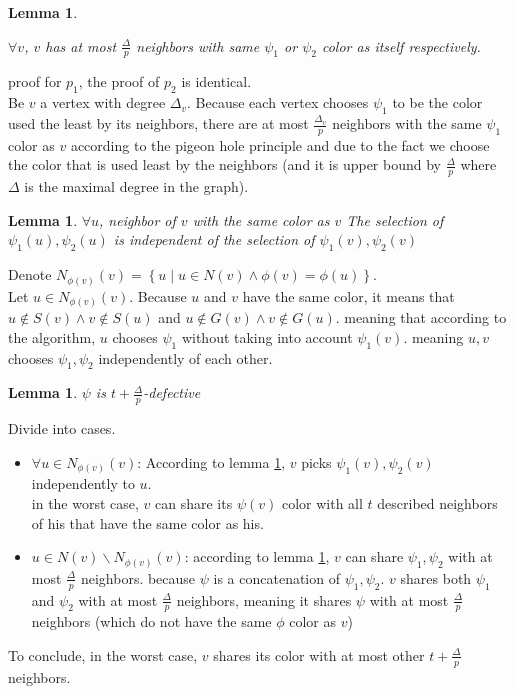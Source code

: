 \documentclass[11pt]{article}
\newtheorem{lemma}[theorem]{Lemma}
\begin{document}
\begin{lemma}
\label{psi_1_2_delta_defective}


$\forall v$, $v$ has at most $\frac{\Delta}{p}$ neighbors with same $\psi_1$ or $\psi_2$ color as itself respectively. 
\end{lemma}
proof for $p_1$, the proof of $p_2$ is identical. \\
Be $v$ a vertex with degree $\Delta_v$. Because each vertex chooses $\psi_1$ to be the color used the least by its neighbors, there are at most $\frac{\Delta_v}{p}$ neighbors with the same $\psi_1$ color as $v$ according to the pigeon hole principle and due to the fact we choose the color that is used least by the neighbors (and it is upper bound by $\frac{\Delta}{p}$ where $\Delta$ is the maximal degree in the graph).

\begin{lemma}
\label{psi_1_2_t_defective}
$\forall u$, neighbor of $v$ with the same color as $v$ The selection of $\psi_1(u),\psi_2(u)$ is independent of the selection of $\psi_1(v),\psi_2(v)$
\end{lemma}
Denote $N_{\phi(v)}(v)= \left\{ u \mid u \in N(v) \land \phi(v) = \phi(u) \right\}$. \\
Let $u \in N_{\phi(v)}(v)$. Because $u$ and $v$ have the same color, it means that $u \notin S(v) \land v \notin S(u)$ and $u \notin G(v) \land v \notin G(u)$. meaning that according to the algorithm, $u$ chooses $\psi_1$ without taking into account $\psi_1(v)$. meaning $u,v$ chooses $\psi_1, \psi_2$ independently of each other.

\begin{lemma}
\label{psi_defective}
$\psi$ is $t+\frac{\Delta}{p}$-defective
\end{lemma}
Divide into cases.
\begin{itemize}
    \item $\forall u\in N_{\phi(v)}(v)$: According to lemma \ref{psi_1_2_t_defective}, $v$ picks $\psi_1(v), \psi_2(v)$ independently to $u$. \\ in the worst case, $v$ can share its $\psi(v)$ color with all $t$ described neighbors of his that have the same color as his.
    \item $u \in N(v) \backslash N_{\phi(v)}(v)$:  according to lemma \ref{psi_1_2_delta_defective}, $v$ can share $\psi_1, \psi_2$ with at most $\frac{\Delta}{p}$ neighbors. because $\psi$ is a concatenation of $\psi_1, \psi_2$. $v$ shares both $\psi_1$ and $\psi_2$ with at most $\frac{\Delta}{p}$ neighbors, meaning it shares $\psi$ with at most $\frac{\Delta}{p}$ neighbors (which do not have the same $\phi$ color as $v$)
\end{itemize}
To conclude, in the worst case, $v$ shares its color with at most other $t + \frac{\Delta}{p}$ neighbors.
\end{document}
